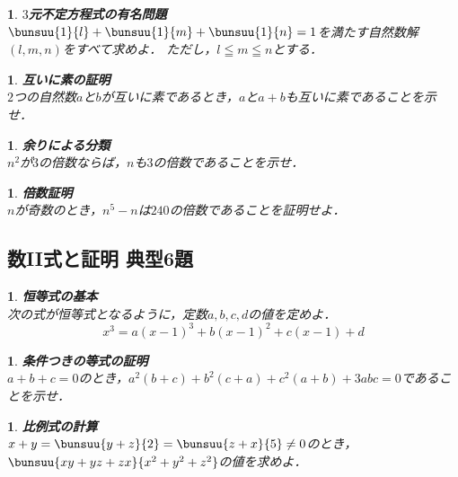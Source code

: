\documentclass[10pt,
fleqn,
dvipdfmx,
uplatex
]{jsarticle}
\newtheorem{question}[Question]{}
\begin{document}
\begin{question}{\bf\boldmath $3$元不定方程式の有名問題}\\
$\bunsuu{1}{l}+\bunsuu{1}{m}+\bunsuu{1}{n}=1$を満たす自然数解$\left(l,m,n\right)$をすべて求めよ．
ただし，$l\leqq m\leqq n$とする．
\end{question}



\begin{question}{\bf\boldmath 互いに素の証明}\\
$2$つの自然数$a$と$b$が互いに素であるとき，$a$と$a+b$も互いに素であることを示せ．
\end{question}



\begin{question}{\bf\boldmath 余りによる分類}\\
$n^2$が$3$の倍数ならば，$n$も$3$の倍数であることを示せ．
\end{question}



\begin{question}{\bf\boldmath 倍数証明}\\
$n$が奇数のとき，$n^5-n$は${240}$の倍数であることを証明せよ．
\end{question}

\subsection{数II式と証明 典型6題}



\begin{question}{\bf\boldmath 恒等式の基本}\\
次の式が恒等式となるように，定数$a, b, c, d$の値を定めよ．
\[x^3=a\left(x-1\right)^3+b\left(x-1\right)^2+c\left(x-1\right)+d\]
\end{question}



\begin{question}{\bf\boldmath 条件つきの等式の証明}\\
$a+b+c=0$のとき，$a^2\left(b+c\right)+b^2\left(c+a\right)+c^2\left(a+b\right)+3abc=0$であることを示せ．
\end{question}



\begin{question}{\bf\boldmath 比例式の計算}\\
$x+y=\bunsuu{{y+z}}{2}=\bunsuu{{z+x}}{5}\neq 0$のとき，$\bunsuu{{xy+yz+zx}}{{x^2+y^2+z^2}}$の値を求めよ．
\end{question}
\end{document}
